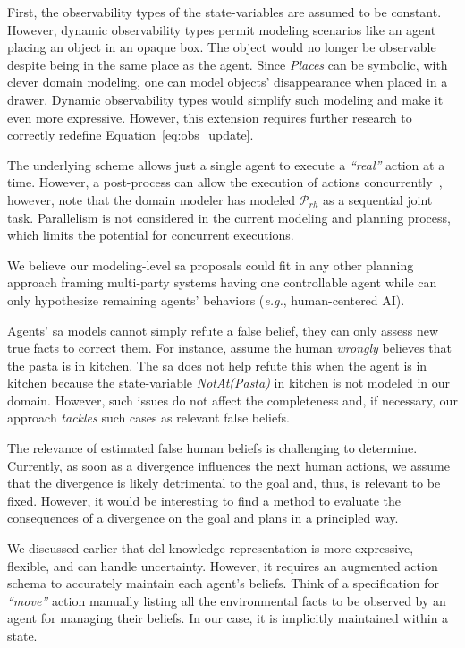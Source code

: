 First, the observability types of the state-variables are assumed to be constant. 
However, dynamic observability types permit modeling scenarios like an agent placing an object in an opaque box. The object would no longer be observable despite being in the same place as the agent. Since \textit{Places} can be symbolic, with clever domain modeling, one can model objects' disappearance when placed in a drawer. Dynamic observability types would simplify such modeling and make it even more expressive. However, this extension requires further research to correctly redefine Equation~\ref{eq:obs_update}. 

The underlying scheme allows just a single agent to execute a \textit{``real''} action at a time. 
However, a post-process can allow the execution of actions concurrently~\cite{CrosbyJR14}, however, note that the domain modeler has modeled $\mathcal{P}_{rh}$ as a sequential joint task. 
Parallelism is not considered in the current modeling and planning process, which limits the potential for concurrent executions.

We believe our modeling-level \acrshort{sa} proposals could fit in any other planning approach framing multi-party systems having one controllable agent while can only hypothesize remaining agents' behaviors (\textit{e.g.}, human-centered AI).

Agents' \acrshort{sa} models cannot simply refute a false belief, they can only assess new true facts to correct them.
For instance, assume the human \textit{wrongly} believes that the pasta is in \textsf{kitchen}. The \acrshort{sa} does not help refute this when the agent is in \textsf{kitchen}
because the state-variable \textit{NotAt(Pasta)} in \textsf{kitchen} is not modeled in our domain.  
However, such issues do not affect the completeness and, if necessary, our approach \textit{tackles} such cases as relevant false beliefs.

The relevance of estimated false human beliefs is challenging to determine. Currently, as soon as a divergence influences the next human actions, we assume that the divergence is likely detrimental to the goal and, thus, is relevant to be fixed. However, it would be interesting to find a method to evaluate the consequences of a divergence on the goal and plans in a principled way.

We discussed earlier that \acrshort{del} knowledge representation is more expressive, flexible, and can handle uncertainty. However, it requires an augmented action schema to accurately maintain each agent's beliefs.
Think of a specification for \textit{``move''} action manually listing all the environmental facts to be observed by an agent for managing their beliefs. In our case, it is implicitly maintained within a state.

